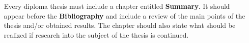 %
%
%
%
%
%
%
%


Every diploma thesis must include a chapter entitled \textbf{Summary}. It should appear before the \textbf{Bibliography} and include a review of the main points of the thesis and/or obtained results. The chapter should also state what should be realized if research into the subject of the thesis is continued.